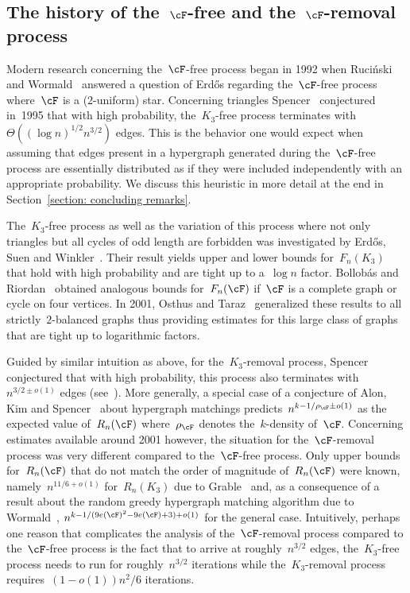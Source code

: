 \documentclass[11pt]{amsart}
\theoremstyle{definition}
\numberwithin{equation}{section}
\begin{document}
	
	
	
	\subsection{The history of the~\texorpdfstring{$\cF$}{F}-free and the~\texorpdfstring{$\cF$}{F}-removal process}\label{subsection: comparison}
	Modern research concerning the~$\cF$-free process began in 1992 when Ruci\'nski and Wormald~\cite{RW:92} answered a question of Erd\H{o}s regarding the~$\cF$-free process where~$\cF$ is a ($2$-uniform) star.
	Concerning triangles Spencer~\cite{S:95b} conjectured in~1995 that with high probability, the~$K_3$-free process terminates with~$\Theta((\log n)^{1/2}n^{3/2})$ edges.
	This is the behavior one would expect when assuming that edges present in a hypergraph generated during the~$\cF$-free process are essentially distributed as if they were included independently with an appropriate probability.
	We discuss this heuristic in more detail at the end in Section~\ref{section: concluding remarks}.
	
	The~$K_3$-free process as well as the variation of this process where not only triangles but all cycles of odd length are forbidden was investigated by Erd\H{o}s, Suen and Winkler~\cite{ESW:95}.
	Their result yields upper and lower bounds for~$F_n(K_3)$ that hold with high probability and are tight up to a~$\log n$ factor.
	Bollob\'as and Riordan~\cite{BR:00} obtained analogous bounds for~$F_n(\cF)$ if~$\cF$ is a complete graph or cycle on four vertices.
	In 2001, Osthus and Taraz~\cite{OT:01} generalized these results to all strictly~$2$-balanced graphs thus providing estimates for this large class of graphs that are tight up to logarithmic factors.
	
	Guided by similar intuition as above, for the~$K_3$-removal process, Spencer conjectured that with high probability, this process also terminates with~$n^{3/2\pm o(1)}$ edges (see~\cite{G:97,W:99}).
	More generally, a special case of a conjecture of Alon, Kim and Spencer~\cite{AKS:97} about hypergraph matchings predicts~$n^{k-1/\rho_\cF\pm o(1)}$ as the expected value of~$R_n(\cF)$ where~$\rho_\cF$ denotes the~$k$-density of~$\cF$.
	Concerning estimates available around 2001 however, the situation for the~$\cF$-removal process was very different compared to the~$\cF$-free process.
	Only upper bounds for~$R_n(\cF)$ that do not match the order of magnitude of~$R_n(\cF)$ were known, namely~$n^{11/6+o(1)}$ for~$R_n(K_3)$ due to Grable~\cite{G:97} and, as a consequence of a result about the random greedy hypergraph matching algorithm due to Wormald~\cite{W:99}, $n^{k-1/(9e(\cF)^2-9e(\cF)+3)+o(1)}$ for the general case.
	Intuitively, perhaps one reason that complicates the analysis of the~$\cF$-removal process compared to the~$\cF$-free process is the fact that to arrive at roughly~$n^{3/2}$ edges, the~$K_3$-free process needs to run for roughly~$n^{3/2}$ iterations while the~$K_3$-removal process requires~$(1-o(1))n^2/6$ iterations.
	
\end{document}
